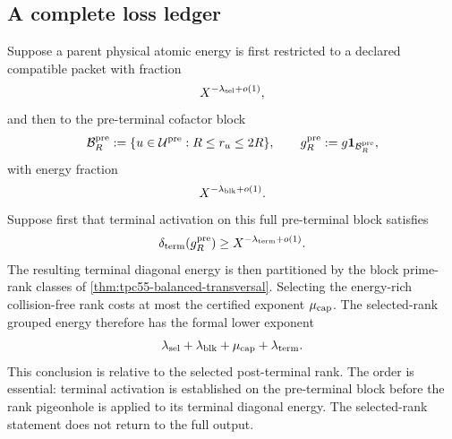 \subsection{A complete loss ledger}

Suppose a parent physical atomic energy is first restricted to a declared
compatible packet with fraction
\begin{equation}
 X^{-\lambda_{\rm sel}+o(1)},
 \label{eq:tpc55-selection-loss}
\end{equation}
and then to the pre-terminal cofactor block
\begin{equation}
 \mathcal B_R^{\rm pre}
 :=\{u\in\mathcal U^{\rm pre}:R\le r_u\le2R\},
 \qquad g_R^{\rm pre}:=g\mathbf 1_{\mathcal B_R^{\rm pre}},
 \label{eq:tpc55-preterminal-block}
\end{equation}
with energy fraction
\begin{equation}
 X^{-\lambda_{\rm blk}+o(1)}.
 \label{eq:tpc55-block-loss}
\end{equation}
Suppose first that terminal activation on this full pre-terminal block
satisfies
\begin{equation}
 \delta_{\rm term}(g_R^{\rm pre})
 \ge X^{-\lambda_{\rm term}+o(1)}.
 \label{eq:tpc55-terminal-loss}
\end{equation}
The resulting terminal diagonal energy is then partitioned by the block
prime-rank classes of \cref{thm:tpc55-balanced-transversal}.  Selecting the
energy-rich collision-free rank costs at most the certified exponent
\(\mu_{\rm cap}\).  The selected-rank grouped energy therefore has the
formal lower exponent
\begin{equation}
 \lambda_{\rm sel}+\lambda_{\rm blk}
 +\mu_{\rm cap}+\lambda_{\rm term}.
 \label{eq:tpc55-selected-rank-ledger}
\end{equation}
This conclusion is relative to the selected post-terminal rank.  The order
is essential: terminal activation is established on the pre-terminal block
before the rank pigeonhole is applied to its terminal diagonal energy.  The
selected-rank statement does not return to the full output.

